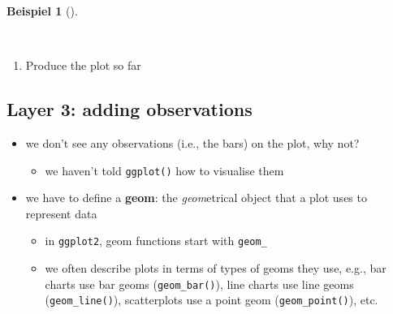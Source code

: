 \documentclass[
  letterpaper,
  DIV=11]{scrartcl}
\providecommand{\tightlist}{%
  \setlength{\itemsep}{0pt}\setlength{\parskip}{0pt}}\usepackage{longtable,booktabs,array}
\theoremstyle{definition}
\newtheorem{example}{Beispiel}[section]
\theoremstyle{remark}
\begin{document}
\begin{tcolorbox}[enhanced jigsaw, colbacktitle=quarto-callout-tip-color!10!white, rightrule=.15mm, toptitle=1mm, bottomtitle=1mm, breakable, leftrule=.75mm, toprule=.15mm, left=2mm, coltitle=black, opacitybacktitle=0.6, title=\textcolor{quarto-callout-tip-color}{\faLightbulb}\hspace{0.5em}{Aufgabe~\ref{exm-layer2}: Mapping aesthetics}, colback=white, titlerule=0mm, arc=.35mm, bottomrule=.15mm, opacityback=0, colframe=quarto-callout-tip-color-frame]

\begin{example}[]\protect\hypertarget{exm-layer2}{}\label{exm-layer2}

~

\begin{enumerate}
\def\labelenumi{\arabic{enumi}.}
\tightlist
\item
  Produce the plot so far
\end{enumerate}

\end{example}

\end{tcolorbox}

\hypertarget{layer-3-adding-observations}{%
\subsection{Layer 3: adding
observations}\label{layer-3-adding-observations}}

\begin{itemize}
\tightlist
\item
  we don't see any observations (i.e., the bars) on the plot, why not?

  \begin{itemize}
  \tightlist
  \item
    we haven't told \texttt{ggplot()} how to visualise them
  \end{itemize}
\item
  we have to define a \textbf{geom}: the \emph{geom}etrical object that
  a plot uses to represent data

  \begin{itemize}
  \tightlist
  \item
    in \texttt{ggplot2}, geom functions start with \texttt{geom\_}
  \item
    we often describe plots in terms of types of geoms they use, e.g.,
    bar charts use bar geoms (\texttt{geom\_bar()}), line charts use
    line geoms (\texttt{geom\_line()}), scatterplots use a point geom
    (\texttt{geom\_point()}), etc.
  \end{itemize}
\end{itemize}
\end{document}

